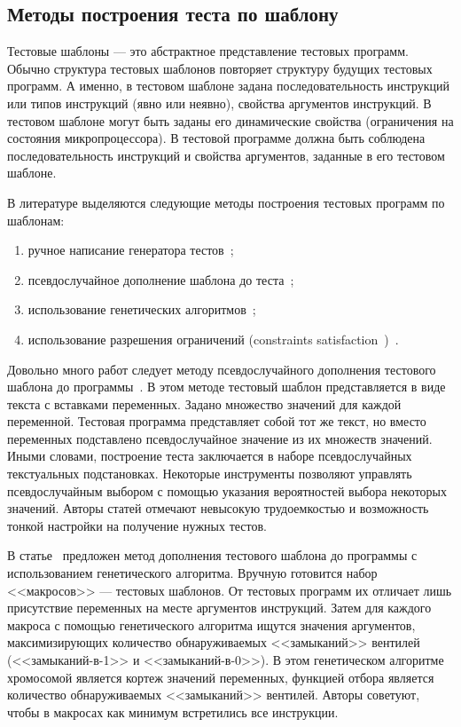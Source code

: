 \subsection{Методы построения теста по шаблону}\label{sec:test_templates_generation_methods}

Тестовые шаблоны --- это абстрактное представление тестовых программ. Обычно структура тестовых шаблонов повторяет структуру будущих тестовых программ. А именно, в тестовом шаблоне задана последовательность инструкций или типов инструкций (явно или неявно), свойства аргументов инструкций. В тестовом шаблоне могут быть заданы его динамические свойства (ограничения на состояния микропроцессора). В тестовой программе должна быть соблюдена последовательность инструкций и свойства аргументов, заданные в его тестовом шаблоне.

В литературе выделяются следующие методы построения тестовых программ по шаблонам:
\begin{enumerate}
	\item ручное написание генератора тестов~\cite{MicroTESK};
	\item псевдослучайное дополнение шаблона до теста~\cite{SEGUE1, SEGUE2, PA-RISC, TSE, Theo, mVpGen};
	\item использование генетических алгоритмов~\cite{GeneticTemplates};
	\item использование разрешения ограничений (constraints satisfaction~\cite{CLPusingECLiPSe})~\cite{GenesysPro, GenesysPro2004Innovations, DeepTrans, RAVEN, MAATG}.
\end{enumerate}

Довольно много работ следует методу псевдослучайного дополнения тестового шаблона до программы~\cite{SEGUE1, SEGUE2, PA-RISC, TSE, Theo, mVpGen}. В этом методе тестовый шаблон представляется в виде текста с вставками переменных. Задано множество значений для каждой переменной. Тестовая программа представляет собой тот же текст, но вместо переменных подставлено псевдослучайное значение из их множеств значений. Иными словами, построение теста заключается в наборе псевдослучайных текстуальных подстановках. Некоторые инструменты позволяют управлять псевдослучайным выбором с помощью указания вероятностей выбора некоторых значений. Авторы статей отмечают невысокую трудоемкостью и возможность тонкой настройки на получение нужных тестов.

В статье~\cite{GeneticTemplates} предложен метод дополнения тестового шаблона до программы с использованием генетического алгоритма. Вручную готовится набор <<макросов>> --- тестовых шаблонов. От тестовых программ их отличает лишь присутствие переменных на месте аргументов инструкций. Затем для каждого макроса с помощью генетического алгоритма ищутся значения аргументов, максимизирующих количество обнаруживаемых <<замыканий>> вентилей (<<замыканий-в-1>> и <<замыканий-в-0>>). В этом генетическом алгоритме хромосомой является кортеж значений переменных, функцией отбора является количество обнаруживаемых <<замыканий>> вентилей. Авторы советуют, чтобы в макросах как минимум встретились все инструкции.

